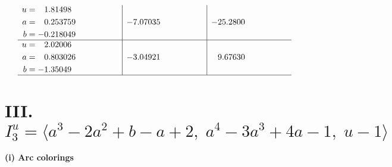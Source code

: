 \documentclass[1p]{elsarticle_modified}
\theoremstyle{definition}
\begin{document}
$$\begin{array}{c|c|c}
\begin{aligned}
u &= \phantom{-}1.81498\phantom{ +0.000000I} \\
a &= \phantom{-}0.253759\phantom{ +0.000000I} \\
b &= -0.218049\phantom{ +0.000000I}\end{aligned}
 & -7.07035\phantom{ +0.000000I} & -25.2800\phantom{ +0.000000I} \\ \hline\begin{aligned}
u &= \phantom{-}2.02006\phantom{ +0.000000I} \\
a &= \phantom{-}0.803026\phantom{ +0.000000I} \\
b &= -1.35049\phantom{ +0.000000I}\end{aligned}
 & -3.04921\phantom{ +0.000000I} & \phantom{-}9.67630\phantom{ +0.000000I}\\
 \hline 
 \end{array}$$\newpage\newpage\renewcommand{\arraystretch}{1}
\centering \section*{III. $I^u_{3}= \langle a^3-2 a^2+b- a+2,\;a^4-3 a^3+4 a-1,\;u-1 \rangle$}
\flushleft \textbf{(i) Arc colorings}\\
\end{document}

